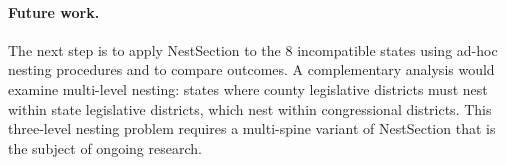 \paragraph{Future work.}
The next step is to apply NestSection to the 8 incompatible states using
ad-hoc nesting procedures and to compare outcomes. A complementary analysis
would examine multi-level nesting: states where county legislative districts
must nest within state legislative districts, which nest within congressional
districts. This three-level nesting problem requires a multi-spine variant of
NestSection that is the subject of ongoing research.
